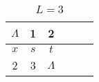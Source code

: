 
\begin{table}
  \centering
  \caption{$L = 3$}
  \begin{tabular}{|c|c|c|c|c|c|}
    \hline
    $\Lambda$ & 1 & 2 & & & \\ \hline
    $x$ & $s$ & $t$ & & & \\ \hline
    2 & 3 & $\Lambda$ & & & \\ \hline
  \end{tabular}
\end{table}